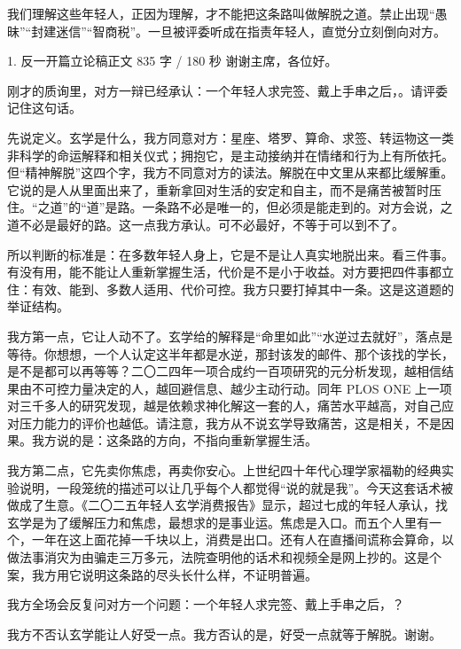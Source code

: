 \documentclass[script,con]{debate}
\begin{document}
\debatetitle
\begin{thesisbox}[全场姿态纪律]我们理解这些年轻人，正因为理解，才不能把这条路叫做解脱之道。禁止出现“愚昧”“封建迷信”“智商税”。一旦被评委听成在指责年轻人，直觉分立刻倒向对方。\end{thesisbox}
\begin{speech}{1. 反一开篇立论稿}{正文 835 字 / 180 秒}
谢谢主席，各位好。

刚才的质询里，对方一辩已经承认：一个年轻人求完签、戴上手串之后，。请评委记住这句话。

先说定义。玄学是什么，我方同意对方：星座、塔罗、算命、求签、转运物这一类非科学的命运解释和相关仪式；拥抱它，是主动接纳并在情绪和行为上有所依托。但“精神解脱”这四个字，我方不同意对方的读法。解脱在中文里从来都比缓解重。它说的是人从里面出来了，重新拿回对生活的安定和自主，而不是痛苦被暂时压住。“之道”的“道”是路。一条路不必是唯一的，但必须是能走到的。对方会说，之道不必是最好的路。这一点我方承认。可不必最好，不等于可以到不了。

所以判断的标准是：在多数年轻人身上，它是不是让人真实地脱出来。看三件事。有没有用，能不能让人重新掌握生活，代价是不是小于收益。对方要把四件事都立住：有效、能到、多数人适用、代价可控。我方只要打掉其中一条。这是这道题的举证结构。

我方第一点，它让人动不了。玄学给的解释是“命里如此”“水逆过去就好”，落点是等待。你想想，一个人认定这半年都是水逆，那封该发的邮件、那个该找的学长，是不是都可以再等等？二〇二四年一项合成约一百项研究的元分析发现，越相信结果由不可控力量决定的人，越回避信息、越少主动行动。同年 PLOS ONE 上一项对三千多人的研究发现，越是依赖求神化解这一套的人，痛苦水平越高，对自己应对压力能力的评价也越低。请注意，我方从不说玄学导致痛苦，这是相关，不是因果。我方说的是：这条路的方向，不指向重新掌握生活。

我方第二点，它先卖你焦虑，再卖你安心。上世纪四十年代心理学家福勒的经典实验说明，一段笼统的描述可以让几乎每个人都觉得“说的就是我”。今天这套话术被做成了生意。《二〇二五年轻人玄学消费报告》显示，超过七成的年轻人承认，找玄学是为了缓解压力和焦虑，最想求的是事业运。焦虑是入口。而五个人里有一个，一年在这上面花掉一千块以上，消费是出口。还有人在直播间谎称会算命，以做法事消灾为由骗走三万多元，法院查明他的话术和视频全是网上抄的。这是个案，我方用它说明这条路的尽头长什么样，不证明普遍。

我方全场会反复问对方一个问题：一个年轻人求完签、戴上手串之后，？

我方不否认玄学能让人好受一点。我方否认的是，好受一点就等于解脱。谢谢。

\begin{contingency}
\end{contingency}
\end{speech}
\end{document}
